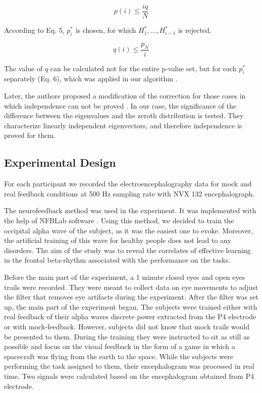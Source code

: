 \documentclass[14pt,a4paper]{scrartcl}
\begin{document}
\begin{equation}
p(i) \leqslant \frac{iq}{N}
\end{equation}

According to Eq. 5, $p^*_i$ is chosen, for which $H^*_1, ... , H^*_{i-1}$ is rejected. 

\begin{equation}
q(i) \leqslant \frac{p_N}{i}
\end{equation}

The value of $q$ can be calculated not for the entire p-value set, but for each $p^*_i$ separately (Eq. 6), which was applied in our algorithm \cite{Benjamini1995}.

Later, the authors proposed a modification of the correction for those cases in which independence can not be proved \cite{Benjamini2001}. In our case, the significance of the difference between the eigenvalues and the zeroth distribution is tested. They characterize linearly independent eigenvectors, and therefore independence is proved for them.

\subsection{Experimental Design}
\label{sec:Methods:Experimental Design}

For each participant we recorded the electroencephalography data for mock and real feedback conditions at 500 Hz sampling rate with NVX 132 encephalograph.

The neurofeedback method was used in the experiment. It was implemented with the help of NFBLab software \cite{Smetanin2016}. Using this method, we decided to train the occipital alpha wave of the subject, as it was the easiest one to evoke. Moreover, the artificial training of this wave for healthy people does not lead to any disorders. The aim of the study was to reveal the correlates of effective learning in the frontal beta-rhythm associated with the performance on the tasks.

Before the main part of the experiment, a 1 minute closed eyes and open eyes trails were recorded. They were meant to collect data on eye movements to adjust the filter that removes eye artifacts during the experiment. After the filter was set up, the main part of the experiment began. The subjects were trained either with real feedback of their alpha waves discrete power extracted from the P4 electrode or with mock-feedback. However, subjects did not know that mock trails would be presented to them. During the training they were instructed to sit as still as possible and focus on the visual feedback in the form of a game in which a spacecraft was flying from the earth to the space. While the subjects were performing the task assigned to them, their encephalogram was processed in real time. Two signals were calculated based on the encephalogram obtained from P4 electrode. 
\end{document}
